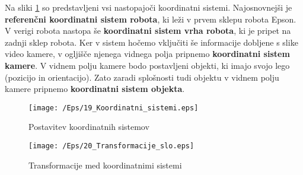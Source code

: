 \begin{mdframed}[backgroundcolor=green!20, shadow=true,roundcorner=8pt]
        \vspace{0.2cm}
Na sliki \ref{fPostavitevKS} so predstavljeni vsi nastopajoči
koordinatni sistemi. Najosnovnejši je \textbf{referenčni koordinatni
sistem robota}, ki leži v prvem sklepu robota Epson. V verigi robota
nastopa še \textbf{koordinatni sistem vrha robota}, ki je pripet na
zadnji sklep robota. Ker v sistem hočemo vključiti še informacije
dobljene s slike video kamere, v ogljišče njenega vidnega polja
pripnemo \textbf{koordinatni sistem kamere}. V vidnem polju kamere
bodo postavljeni objekti, ki imajo svojo lego (pozicijo in
orientacijo). Zato zaradi splošnosti tudi objektu v vidnem polju
kamere pripnemo \textbf{ koordinatni sistem objekta}.
\end{mdframed}

\begin{figure}[h]
    \center
    \texttt{[image: /Eps/19\_Koordinatni\_sistemi.eps]}
    \vspace{-0.3cm}
    \caption{Postavitev koordinatnih sistemov}
    \label{fPostavitevKS}
\end{figure}



\begin{figure}[t]
    \center
    \texttt{[image: /Eps/20\_Transformacije\_slo.eps]}
    \vspace{-0.3cm}
    \caption{Transformacije med koordinatnimi sistemi}
    \label{fTransformacija}
\end{figure}

\vspace*{-0.5cm} %

